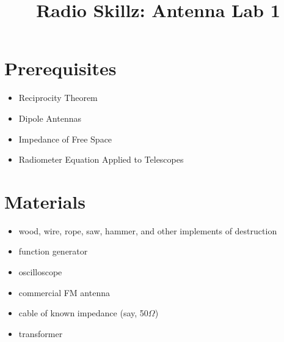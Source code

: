 \documentclass[11pt]{article}
\begin{document}
\title{Radio Skillz: Antenna Lab 1}

\maketitle

\section*{Prerequisites}

\begin{itemize}
\item Reciprocity Theorem
\item Dipole Antennas
\item Impedance of Free Space
\item Radiometer Equation Applied to Telescopes
\end{itemize}

\section*{Materials}

\begin{itemize}
\item wood, wire, rope, saw, hammer, and other implements of destruction
\item function generator
\item oscilloscope
\item commercial FM antenna
\item cable of known impedance (say, 50$\Omega$)
\item transformer
\end{itemize}

\end{document}
